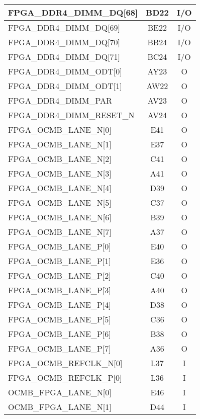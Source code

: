 \begin{longtable}[l]{| l | c | c |}
  FPGA\_DDR4\_DIMM\_DQ[68]     & BD22 & I/O \\ \hline
  FPGA\_DDR4\_DIMM\_DQ[69]     & BE22 & I/O \\ \hline
  FPGA\_DDR4\_DIMM\_DQ[70]     & BB24 & I/O \\ \hline
  FPGA\_DDR4\_DIMM\_DQ[71]     & BC24 & I/O \\ \hline
  FPGA\_DDR4\_DIMM\_ODT[0]     & AY23 & O   \\ \hline
  FPGA\_DDR4\_DIMM\_ODT[1]     & AW22 & O   \\ \hline
  FPGA\_DDR4\_DIMM\_PAR        & AV23 & O   \\ \hline
  FPGA\_DDR4\_DIMM\_RESET\_N   & AV24 & O   \\ \hline
  FPGA\_OCMB\_LANE\_N[0]       & E41  & O   \\ \hline
  FPGA\_OCMB\_LANE\_N[1]       & E37  & O   \\ \hline
  FPGA\_OCMB\_LANE\_N[2]       & C41  & O   \\ \hline
  FPGA\_OCMB\_LANE\_N[3]       & A41  & O   \\ \hline
  FPGA\_OCMB\_LANE\_N[4]       & D39  & O   \\ \hline
  FPGA\_OCMB\_LANE\_N[5]       & C37  & O   \\ \hline
  FPGA\_OCMB\_LANE\_N[6]       & B39  & O   \\ \hline
  FPGA\_OCMB\_LANE\_N[7]       & A37  & O   \\ \hline
  FPGA\_OCMB\_LANE\_P[0]       & E40  & O   \\ \hline
  FPGA\_OCMB\_LANE\_P[1]       & E36  & O   \\ \hline
  FPGA\_OCMB\_LANE\_P[2]       & C40  & O   \\ \hline
  FPGA\_OCMB\_LANE\_P[3]       & A40  & O   \\ \hline
  FPGA\_OCMB\_LANE\_P[4]       & D38  & O   \\ \hline
  FPGA\_OCMB\_LANE\_P[5]       & C36  & O   \\ \hline
  FPGA\_OCMB\_LANE\_P[6]       & B38  & O   \\ \hline
  FPGA\_OCMB\_LANE\_P[7]       & A36  & O   \\ \hline
  FPGA\_OCMB\_REFCLK\_N[0]     & L37  & I   \\ \hline
  FPGA\_OCMB\_REFCLK\_P[0]     & L36  & I   \\ \hline
  OCMB\_FPGA\_LANE\_N[0]       & E46  & I   \\ \hline
  OCMB\_FPGA\_LANE\_N[1]       & D44  & I   \\ \hline

\end{longtable}
